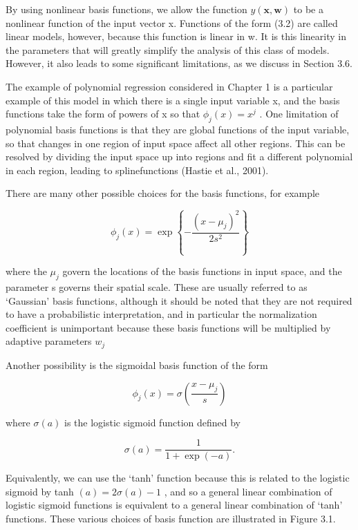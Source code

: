 \documentclass[
  10
]{article}
\begin{document}
By using nonlinear basis functions, we allow the function
\(y ( \mathbf { x } , \mathbf { w } )\) to be a nonlinear function of
the input vector x. Functions of the form (3.2) are called linear
models, however, because this function is linear in w. It is this
linearity in the parameters that will greatly simplify the analysis of
this class of models. However, it also leads to some significant
limitations, as we discuss in Section 3.6.

The example of polynomial regression considered in Chapter 1 is a
particular example of this model in which there is a single input
variable x, and the basis functions take the form of powers of x so that
\(\phi _ { j } ( x ) = x ^ { j }\) . One limitation of polynomial basis
functions is that they are global functions of the input variable, so
that changes in one region of input space affect all other regions. This
can be resolved by dividing the input space up into regions and fit a
different polynomial in each region, leading to splinefunctions (Hastie
et al., 2001).

There are many other possible choices for the basis functions, for
example

\[
\phi_ {j} (x) = \exp \left\{- \frac {(x - \mu_ {j}) ^ {2}}{2 s ^ {2}} \right\}\tag{3.4}
\]

where the \(\mu _ { j }\) govern the locations of the basis functions in
input space, and the parameter s governs their spatial scale. These are
usually referred to as `Gaussian' basis functions, although it should be
noted that they are not required to have a probabilistic interpretation,
and in particular the normalization coefficient is unimportant because
these basis functions will be multiplied by adaptive parameters
\(w _ { j }\)

Another possibility is the sigmoidal basis function of the form

\[
\phi_ {j} (x) = \sigma \left(\frac {x - \mu_ {j}}{s}\right)\tag{3.5}
\]

where \(\sigma ( a )\) is the logistic sigmoid function defined by

\[
\sigma (a) = \frac {1}{1 + \exp (- a)}.\tag{3.6}
\]

Equivalently, we can use the `tanh' function because this is related to
the logistic sigmoid by tanh \(( a ) = 2 \sigma ( a ) - 1\) , and so a
general linear combination of logistic sigmoid functions is equivalent
to a general linear combination of `tanh' functions. These various
choices of basis function are illustrated in Figure 3.1.
\end{document}
